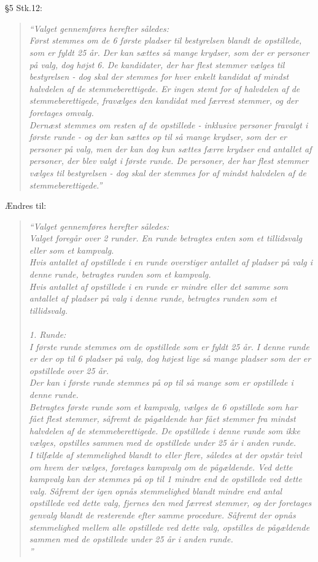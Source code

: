 \documentclass[a4paper,12pt,danish]{article}
\newcommand\cit[1]{
    \begin{quote}
        \textit{``#1''}
    \end{quote}
}
\newcommand\change[1]{
    \section{}
    #1
}
\begin{document}
\change{
	\S5 Stk.12:
    \cit{Valget gennemføres herefter således:\\
Først stemmes om de 6 første pladser til bestyrelsen blandt de opstillede, som er fyldt 25 år. Der kan sættes så mange krydser, som der er personer på valg, dog højst 6. De kandidater, der har flest stemmer vælges til bestyrelsen - dog skal der stemmes for hver enkelt kandidat af mindst halvdelen af de stemmeberettigede. Er ingen stemt for af halvdelen af de stemmeberettigede, fravælges den kandidat med færrest stemmer, og der foretages omvalg.\\
Dernæst stemmes om resten af de opstillede - inklusive personer fravalgt i første runde - og der kan sættes op til så mange krydser, som der er personer på valg, men der kan dog kun sættes færre krydser end antallet af personer, der blev valgt i første runde. De personer, der har flest stemmer vælges til bestyrelsen - dog skal der stemmes for af mindst halvdelen af de stemmeberettigede.}
    Ændres til:
    \cit{Valget gennemføres herefter således:\\
Valget foregår over 2 runder. En runde betragtes enten som et tillidsvalg eller som et kampvalg.\\
Hvis antallet af opstillede i en runde overstiger antallet af pladser på valg i denne runde, betragtes runden som et kampvalg.\\
Hvis antallet af opstillede i en runde er mindre eller det samme som antallet af pladser på valg i denne runde, betragtes runden som et tillidsvalg.\\
\\
1. Runde:\\
I første runde stemmes om de opstillede som er fyldt 25 år. I denne runde er der op til 6 pladser på valg, dog højest lige så mange pladser som der er opstillede over 25 år.\\
Der kan i første runde stemmes på op til så mange som er opstillede i denne runde.\\
Betragtes første runde som et kampvalg, vælges de 6 opstillede som har fået flest stemmer, såfremt de pågældende har fået stemmer fra mindst halvdelen af de stemmeberettigede. De opstillede i denne runde som ikke vælges, opstilles sammen med de opstillede under 25 år i anden runde.\\
I tilfælde af stemmelighed blandt to eller flere, således at der opstår tvivl om hvem der vælges, foretages kampvalg om de pågældende. Ved dette kampvalg kan der stemmes på op til 1 mindre end de opstillede ved dette valg. Såfremt der igen opnås stemmelighed blandt mindre end antal opstillede ved dette valg, fjernes den med færrest stemmer, og der foretages genvalg blandt de resterende efter samme procedure. Såfremt der opnås stemmelighed mellem alle opstillede ved dette valg, opstilles de pågældende sammen med de opstillede under 25 år i anden runde.\\
}}
\end{document}
